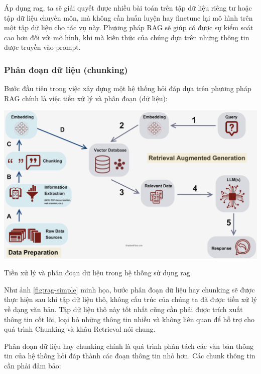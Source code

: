 \documentclass[a4paper, 12pt, openany]{book}
\begin{document}
\vspace{0.5cm}

Áp dụng \acl{rag}, ta sẽ giải quyết được nhiều bài toán trên tập dữ liệu riêng tư hoặc tập dữ liệu chuyên môn, mà không cần huấn luyện hay finetune lại mô hình trên một tập dữ liệu cho tác vụ này.
Phương pháp RAG sẽ giúp có được sự kiểm soát cao hơn đối với mô hình, khi mà kiến thức của chúng dựa trên những thông tin được truyền vào prompt.

\subsubsection{Phân đoạn dữ liệu (chunking)}

Bước đầu tiên trong việc xây dựng một hệ thống hỏi đáp dựa trên phương pháp RAG chính là việc tiền xử lý và phân đoạn (dữ liệu):

\begin{minipage}{\linewidth}
    \centering
    \includegraphics[width=.8\linewidth]{./assets/images/RAG-simple.png}
    \captionsetup{type=figure}
    \caption{Tiền xử lý và phân đoạn dữ liệu trong hệ thống sử dụng \ac{rag}.}
    \label{fig:rag-simple}
\end{minipage}

\vspace{0.5cm}

Như ảnh \ref{fig:rag-simple} minh họa, bước phân đoạn dữ liệu hay chunking sẽ được thực hiện sau khi tập dữ liệu thô, không cấu trúc của chúng ta đã được tiền xử lý về dạng văn bản.
Tập dữ liệu thô này tốt nhất cũng cần phải được trích xuất thông tin cốt lõi, loại bỏ những thông tin nhiễu và không liên quan để hỗ trợ cho quá trình Chunking và khâu Retrieval nói chung.

Phân đoạn dữ liệu hay chunking chính là quá trình phân tách các văn bản thông tin của hệ thống hỏi đáp thành các đoạn thông tin nhỏ hơn.
Các chunk thông tin cần phải đảm bảo:
\end{document}
